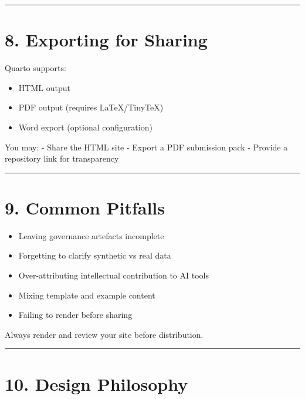 \documentclass[
]{report}
\providecommand{\tightlist}{%
  \setlength{\itemsep}{0pt}\setlength{\parskip}{0pt}}
\begin{document}
\begin{center}\rule{0.5\linewidth}{0.5pt}\end{center}

\section{8. Exporting for Sharing}\label{exporting-for-sharing}

Quarto supports:

\begin{itemize}
\tightlist
\item
  HTML output
\item
  PDF output (requires LaTeX/TinyTeX)
\item
  Word export (optional configuration)
\end{itemize}

You may: - Share the HTML site - Export a PDF submission pack - Provide
a repository link for transparency

\begin{center}\rule{0.5\linewidth}{0.5pt}\end{center}

\section{9. Common Pitfalls}\label{common-pitfalls}

\begin{itemize}
\tightlist
\item
  Leaving governance artefacts incomplete\\
\item
  Forgetting to clarify synthetic vs real data\\
\item
  Over-attributing intellectual contribution to AI tools\\
\item
  Mixing template and example content\\
\item
  Failing to render before sharing
\end{itemize}

Always render and review your site before distribution.

\begin{center}\rule{0.5\linewidth}{0.5pt}\end{center}

\section{10. Design Philosophy}\label{design-philosophy}
\end{document}

